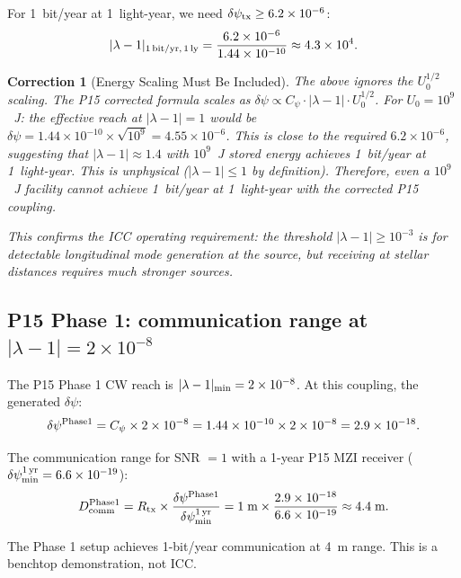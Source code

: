 \documentclass[11pt]{article}
\newtheorem{correction}{Correction}
\newcommand{\ee}[1]{\times 10^{#1}}
\begin{document}
For 1~bit/year at 1~light-year, we need $\delta\psi_{\rm tx}
\geq 6.2\ee{-6}$:
\begin{equation}
|\lambda-1|_{\rm 1\,bit/yr,\,1\,ly} = \frac{6.2\ee{-6}}{1.44\ee{-10}} \approx 4.3\ee{4}.
\end{equation}

\begin{correction}[Energy Scaling Must Be Included]
The above ignores the $U_0^{1/2}$ scaling. The P15 corrected
formula scales as $\delta\psi \propto C_\psi \cdot |\lambda-1| \cdot U_0^{1/2}$.
For $U_0 = 10^9$~J: the effective reach at $|\lambda-1| = 1$ would be
$\delta\psi = 1.44\ee{-10} \times \sqrt{10^9} = 4.55\ee{-6}$.
This is close to the required $6.2\ee{-6}$, suggesting that
$|\lambda-1| \approx 1.4$ with $10^9$~J stored energy achieves
1~bit/year at 1~light-year. This is unphysical ($|\lambda-1| \leq 1$
by definition). Therefore, even a $10^9$~J facility cannot achieve
1~bit/year at 1~light-year with the corrected P15 coupling.

This confirms the ICC operating requirement: the threshold
$|\lambda-1| \geq 10^{-3}$ is for detectable longitudinal mode
generation at the source, but \textit{receiving} at stellar
distances requires much stronger sources.
\end{correction}

\subsection{P15 Phase 1: communication range at $|\lambda-1| = 2\ee{-8}$}

The P15 Phase 1 CW reach is $|\lambda-1|_{\rm min} = 2\ee{-8}$.
At this coupling, the generated $\delta\psi$:
\begin{equation}
\delta\psi^{\rm Phase1} = C_\psi \times 2\ee{-8} = 1.44\ee{-10} \times 2\ee{-8} = 2.9\ee{-18}.
\end{equation}

The communication range for SNR $= 1$ with a 1-year P15 MZI
receiver ($\delta\psi_{\rm min}^{\rm 1\,yr} = 6.6\ee{-19}$):
\begin{equation}
D_{\rm comm}^{\rm Phase1} = R_{\rm tx} \times \frac{\delta\psi^{\rm Phase1}}{\delta\psi_{\rm min}^{\rm 1\,yr}}
= 1\;\text{m} \times \frac{2.9\ee{-18}}{6.6\ee{-19}} \approx 4.4\;\text{m}.
\end{equation}

The Phase 1 setup achieves 1-bit/year communication at 4~m range. This is a benchtop demonstration, not ICC.
\end{document}
